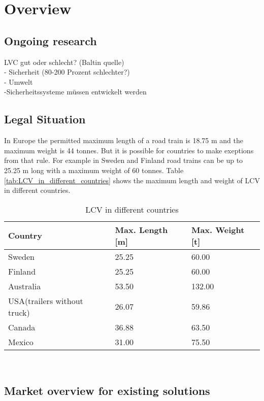 \documentclass[ExampleMasters.tex]{subfiles}
\begin{document}
\clearpage
\chapter{Overview}
\label{chap:overview}
\section{Ongoing research}
LVC gut oder schlecht? (Baltin quelle) \\
- Sicherheit (80-200 Prozent schlechter?) \\
- Umwelt \\
-Sicherheitssysteme müssen entwickelt werden


\label{sec:ongoing_research}
\section{Legal Situation}
\label{sec:legal_situation}
In Europe the permitted maximum length of a road train is 18.75 m and the maximum weight is 44 tonnes. But it is possible for countries to make exeptions from that rule.\cite{96/53/EC}  For example in Sweden and Finland road trains can be up to 25.25 m long with a  maximum weight of 60 tonnes.\cite{Vaegverket}
Table \ref{tab:LCV_in_different_countries} shows the maximum length and weight of LCV in different countries.

\begin{table}[h]
	\centering
	\caption{LCV in different countries\cite{Vaegverket}\cite{LCV_Australia}\Cite{LCV_USA}\cite{LCV_Canada}\Cite{LCV_Mexico}}
	\label{tab:LVC_in_different_countries}
	\begin{tabular}{l|l|l|}
		Country   & Max. Length [m] & Max. Weight [t] \\ \hline
		Sweden    &       25.25      &       60.00      \\
		Finland   &            25.25 &         60.00    \\
		Australia &      53.50       &           132.00  \\
		USA(trailers without truck)&      26.07       &    59.86        \\
		Canada & 36.88 & 63.50 \\
		Mexico & 31.00 & 75.50 \\
	\end{tabular} \\
\end{table}
\section{Market overview for existing solutions}

\label{sec:market_overview}
\end{document}
